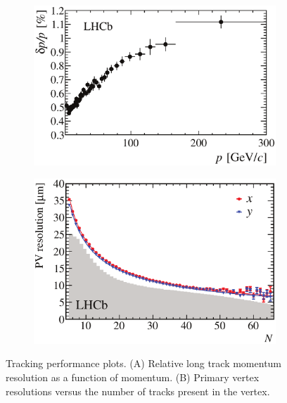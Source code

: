 \begin{figure}[t]
  \centering
  \begin{subfigure}{0.5\textwidth}
    \raggedright
    \includegraphics[width=\textwidth]{Figures/Chapter2/dppVsp-crop-cmyk}
    \caption{}
    \label{det_deltappvp}
  \end{subfigure}%
  \begin{subfigure}{0.5\textwidth}
    \raggedleft
    \includegraphics[width=\textwidth]{Figures/Chapter2/DataResXY_1PV_2012-crop-cmyk.pdf}
    \caption{}
    \label{det_velo_pv_res}
  \end{subfigure}
  \caption{Tracking performance plots. (A) Relative long track momentum resolution as a function of momentum.
          (B) Primary vertex resolutions versus the number of tracks present in the vertex.}
  \label{det_velo_perf}
\end{figure}

